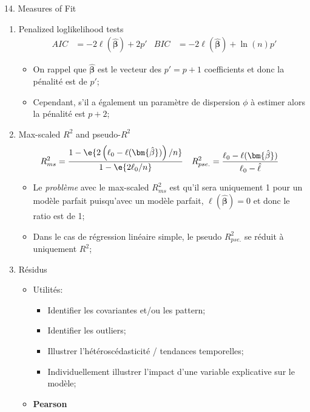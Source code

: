 \documentclass[12pt, titlepage, french]{report}
\begin{document}
\begin{CHPT_SUMM}{14. Measures of Fit}
\begin{enumerate}
\begin{itemize}
\begin{itemize}
			\item	Finalement, on note que la log-vraisemblance du modèle complet (saturé) devrait être supérieure à celle du modèle réduite;
		\end{itemize}
	\end{itemize}
	\item	Penalized loglikelihood tests
	\begin{align*}
		AIC &= -2 \ell(\bm{\hat{\beta}}) + 2 p'	&
		BIC &= -2 \ell(\bm{\hat{\beta}}) + \ln (n) p'
	\end{align*}
	\begin{itemize}
		\item	On rappel que $\bm{\hat{\beta}}$ est le vecteur des $p' = p + 1$ coefficients et donc la pénalité est de $p'$;
		\item	Cependant, s'il a également un paramètre de dispersion $\phi$ à estimer alors la pénalité est $p + 2$;
	\end{itemize}
	\item	Max-scaled $R^{2}$ and pseudo-$R^{2}$
	\begin{align*}
		R^{2}_{ms}	&=	\frac{1 - \e{2\left(\ell_{0} - \ell(\bm{\hat{\beta}})\right)/n}}{1 - \e{2 \ell_{0}/n}}	&
		R^{2}_{pse.}	&=	\frac{\ell_{0} - \ell(\bm{\hat{\beta}})}{\ell_{0} - \hat{\ell}}
	\end{align*}
	\begin{itemize}
		\item	Le \og \textit{problème} \fg{} avec le max-scaled $R^{2}_{ms}$ est qu'il sera uniquement 1 pour un modèle parfait puisqu'avec un modèle parfait, $\ell(\bm{\hat{\beta}}) = 0$ et donc le ratio est de 1;
		\item	Dans le cas de régression linéaire simple, le pseudo $R^{2}_{pse.}$ se réduit à uniquement $R^{2}$;
	\end{itemize}
	\item	Résidus
	\begin{itemize}
		\item	Utilités:
		\begin{itemize}
			\item	Identifier les covariantes et/ou les pattern;
			\item	Identifier les outliers;
			\item	Illustrer l'hétéroscédasticité / tendances temporelles;
			\item	Individuellement illustrer l'impact d'une variable explicative sur le modèle;
		\end{itemize}
		\item	\textbf{Pearson} 

\end{itemize}
\end{enumerate}
\end{CHPT_SUMM}
\end{document}
